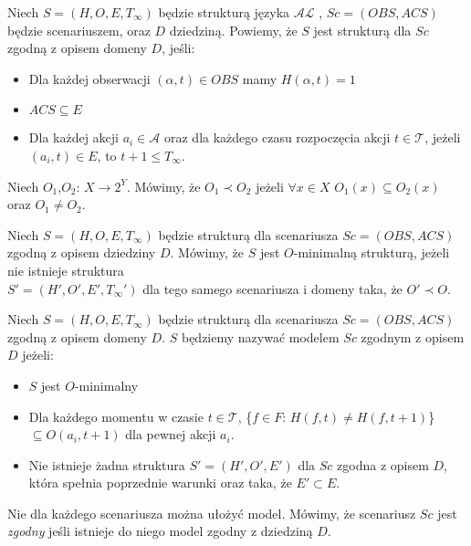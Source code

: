    \begin{definition}
   Niech $S = (H,O,E,T_{\infty})$ będzie strukturą języka $\mathcal{AL}$ , $ Sc=(OBS,ACS) $ będzie scenariuszem, oraz $ D $ dziedziną. Powiemy, że $ S $ jest strukturą dla $Sc$ zgodną z opisem domeny $D$, jeśli:
   		\begin{itemize} 
     		\item Dla każdej obserwacji $(\alpha,t )\in OBS$ mamy $H(\alpha,t )=1$
     		\item $ACS \subseteq E$ 
     		\item Dla każdej akcji $ {a_i \in \mathcal{A}}$ oraz dla każdego czasu rozpoczęcia akcji $t \in \mathcal{T}$, jeżeli $(a_i,t) \in E $, to $t+1 \leq T_{\infty}$. 
    		\end{itemize} 
   \end{definition}
   \begin{definition}
	   Niech $O_{1}$,$O_{2}$: $X \longrightarrow 2^{Y}$. Mówimy, że $O_{1} \prec O_{2}$ jeżeli $\forall x\in X$ $O_{1}(x)\subseteq O_{2}(x)$ oraz $O_{1}\neq O_{2}$.
   \end{definition}
   
   \begin{definition}
   Niech $S=(H,O,E,T_{\infty})$ będzie strukturą dla scenariusza $Sc=(OBS,ACS)$ zgodną z opisem dziedziny $D$. Mówimy, że $S$ jest $O$-minimalną strukturą, jeżeli nie istnieje struktura \\$S'=(H',O',E',T_{\infty}')$ dla tego samego scenariusza i domeny taka, że $O'\prec O$.  
   \end{definition}
   \begin{definition}
   Niech $S=(H,O,E,T_{\infty})$ będzie strukturą dla scenariusza $Sc=(OBS,ACS)$ zgodną z opisem domeny $D$. $S$ będziemy nazywać modelem $Sc$ zgodnym z opisem $D$ jeżeli:
   \begin{itemize}
		\item $S$ jest $O$-minimalny
		\item Dla każdego momentu w czasie $t \in \mathcal{T}$,  \{$f\in F$: $H(f,t)\neq H(f,t+1) $\} $\subseteq O(a_i,t+1)$ dla pewnej akcji $a_i$.
		\item Nie istnieje żadna struktura $S'=(H',O',E')$ dla $Sc$ zgodna z opisem $D$, która spełnia poprzednie warunki oraz taka, że $E'\subset E$. 
   \end{itemize}
\end{definition}

\begin{remark}
Nie dla każdego scenariusza można ułożyć model. Mówimy, że scenariusz $Sc$ jest \textit{zgodny} jeśli istnieje do niego model zgodny z dziedziną $D$.
\end{remark}

